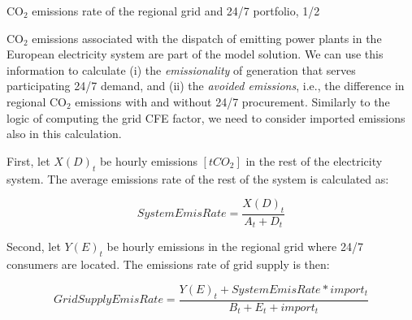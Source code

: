 \begin{frame}{CO$_2$ emissions rate of the regional grid and 24/7 portfolio, 1/2}

  {\small

  \alert{CO$_2$ emissions} associated with the dispatch of emitting power plants 
  in the European electricity system are part of the model solution.
  We can use this information to calculate (i) the \emph{emissionality} of generation 
  that serves participating 24/7 demand, and (ii) the \emph{avoided emissions}, i.e.,
  the difference in regional CO$_2$ emissions with and without 24/7 procurement. 
  Similarly to the logic of computing the grid CFE factor, 
  we need to consider imported emissions also in this calculation.
  
  First, let $X(D)_t$ be hourly emissions $[tCO_2]$ in the rest of the electricity system. 
  The average emissions rate of the rest of the system is calculated as:

  \begin{equation*}
  SystemEmisRate = \frac{X(D)_t}{A_t + D_t}
  \end{equation*}

  Second, let $Y(E)_t$ be hourly emissions in the regional grid where 24/7 consumers are located.
  The emissions rate of grid supply is then:

  \begin{equation*}
  GridSupplyEmisRate = \frac{Y(E)_t + SystemEmisRate * import_t}{B_t + E_t + import_t}
  \end{equation*}

  }
\end{frame}



